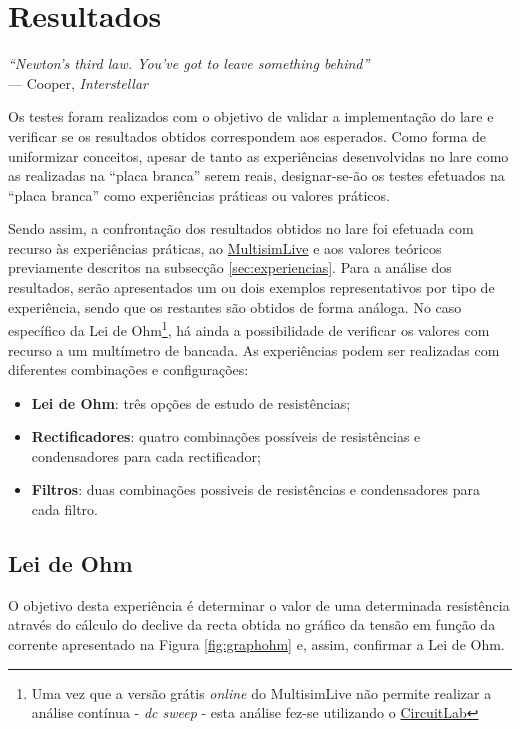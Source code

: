 \chapter{Resultados}
\label{Capítulo5}

\begin{flushright}
\textit{``Newton's third law. You've got to leave something behind''} \\[0.5em]
--- Cooper, \textit{Interstellar}
\end{flushright}

Os testes foram realizados com o objetivo de validar a implementação do \acrshort{lare} e verificar se os resultados obtidos correspondem aos esperados. Como forma de uniformizar conceitos, apesar de tanto as experiências desenvolvidas no \acrshort{lare} como as realizadas na ``placa branca'' serem reais, designar-se-ão os testes efetuados na ``placa branca'' como experiências práticas ou valores práticos.

Sendo assim, a confrontação dos resultados obtidos no \acrshort{lare} foi efetuada com recurso às experiências práticas, ao \href{https://www.multisim.com}{MultisimLive} e aos valores teóricos previamente descritos na subsecção \ref{sec:experiencias}. Para a análise dos resultados, serão apresentados um ou dois exemplos representativos por tipo de experiência, sendo que os restantes são obtidos de forma análoga. No caso específico da Lei de Ohm\footnote{Uma vez que a versão grátis \textit{online} do MultisimLive não permite realizar a análise contínua - \textit{dc sweep} - esta análise fez-se utilizando o \href{https://www.circuitlab.com/}{CircuitLab}}, há ainda a possibilidade de verificar os valores com recurso a um multímetro de bancada. As experiências podem ser realizadas com diferentes combinações e configurações:

\begin{itemize}
	\item \textbf{Lei de Ohm}: três opções de estudo de resistências;
	\item \textbf{Rectificadores}: quatro combinações possíveis de resistências e condensadores para cada rectificador;
	\item \textbf{Filtros}: duas combinações possiveis de resistências e condensadores para cada filtro.
\end{itemize}

\section{Lei de Ohm}
\label{sec:resultados_lei_de_ohm}
O objetivo desta experiência é determinar o valor de uma determinada resistência através do cálculo do declive da recta obtida no gráfico da tensão em função da corrente apresentado na Figura \ref{fig:graphohm} e, assim, confirmar a Lei de Ohm.

